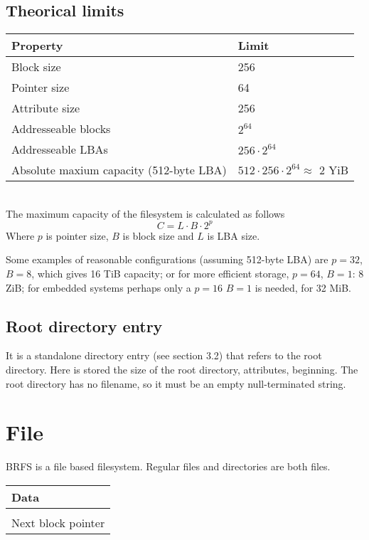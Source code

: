 \documentclass[]{article}
\begin{document}
	\subsection{Theorical limits}
	
	\begin{tabular}{|l|l|} 
		\hline
		\textbf{Property} & \textbf{Limit} \\ [0.5ex] 
		\hline
		Block size & 256 \\ 
		\hline
		Pointer size & 64 \\
		\hline
		Attribute size & 256 \\
		\hline
		Addresseable blocks & $2^{64}$ \\
		\hline	
		Addresseable LBAs & $256 \cdot 2^{64}$ \\
		\hline
		Absolute maxium capacity (512-byte LBA) & $512 \cdot 256 \cdot 2^{64} \approx $ 2 YiB \\
		\hline
	\end{tabular}\\

	The maximum capacity of the filesystem is calculated as follows
	\begin{equation}
		C = L \cdot B \cdot 2^p
	\end{equation}
	Where $p$ is pointer size, $B$ is block size and $L$ is LBA size.
	
	Some examples of reasonable configurations (assuming 512-byte LBA) are $p = 32$, $B = 8$, which gives 16 TiB capacity; or for more efficient storage, $p = 64$, $B = 1$: 8 ZiB; for embedded systems perhaps only a $p = 16$ $B = 1$ is needed, for 32 MiB.

	\subsection{Root directory entry}
	
	It is a standalone directory entry (see section 3.2) that refers to the root directory. Here is stored the size of the root directory, attributes, beginning. The root directory has no filename, so it must be an empty null-terminated string.

	\section{File}
	
	BRFS is a file based filesystem. Regular files and directories are both files. 
	
	\begin{tabular}{|l|} 
		\hline
		Data \\
		\hline
		[Padding] \\
		\hline
		Next block pointer \\
		\hline
	\end{tabular}
\end{document}
